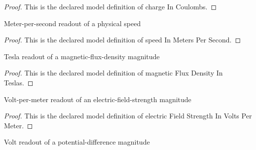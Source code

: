 \begin{proof}
  This is the declared model definition of charge In Coulombs.
\end{proof}
\begin{definition}
  \label{def:physics:phyx-mini-0634:phyxminiproblems-problemphyxmini0634-speedinmeterspersecond}
  Meter-per-second readout of a physical speed
\end{definition}
\begin{proof}
  This is the declared model definition of speed In Meters Per Second.
\end{proof}
\begin{definition}
  \label{def:physics:phyx-mini-0634:phyxminiproblems-problemphyxmini0634-magneticfluxdensityinteslas}
  Tesla readout of a magnetic-flux-density magnitude
\end{definition}
\begin{proof}
  This is the declared model definition of magnetic Flux Density In Teslas.
\end{proof}
\begin{definition}
  \label{def:physics:phyx-mini-0634:phyxminiproblems-problemphyxmini0634-electricfieldstrengthinvoltspermeter}
  Volt-per-meter readout of an electric-field-strength magnitude
\end{definition}
\begin{proof}
  This is the declared model definition of electric Field Strength In Volts Per Meter.
\end{proof}
\begin{definition}
  \label{def:physics:phyx-mini-0634:phyxminiproblems-problemphyxmini0634-potentialdifferenceinvolts}
  Volt readout of a potential-difference magnitude
\end{definition}
